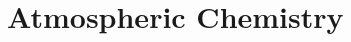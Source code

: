 %
%
\newcommand{\ddt}{\frac{\partial}{\partial t}}
\newcommand{\rhod}{\rho_{\rm dref}}
\newcommand{\scalar}[1]{{s}_\ast^{(#1)}}
\newcommand{\source}[1]{{\cal S}_\ast^{(#1)}}
\newcommand{\divergence}{{\vec\nabla\cdot}}
\newcommand{\NEQ}{N_{\rm eq}}
\newcommand{\NREAC}{N_{\rm reac}}
\newcommand{\avg}[1]{\overline{#1}}
\newcommand{\Pmuavg}{{P_\mu^{\rm avg}}}
\newcommand{\Pmusub}{{P_\mu^{\rm sub}}}
\newcommand{\fmuavg}{{f_\mu^{\rm avg}}}
\newcommand{\fmusub}{{f_\mu^{\rm sub}}}
%
\newcommand{\refs}[1]{{\small\par%
\noindent\global\hangindent=1cm\global\hangafter=1{#1}\par}}
%
\newcommand{\ul}[1]{$\underline{\mbox{#1}}$}
\newcommand{\oxy}{\mbox{O($^{1}$D)}}
\newcommand{\ogr}{\mbox{O($^{3}$P)}}
\newcommand{\oxyd}{\mbox{O$_2$}}
\newcommand{\ozo}{\mbox{O$_3$}}
\newcommand{\oxo}{\mbox{O$_4$}}
\newcommand{\sul}{\mbox{S$_2$}}
\newcommand{\hyd}{\mbox{H$_2$}}
\newcommand{\oio}{\mbox{O${_{4}}{^{2-}}$}}
\newcommand{\met}{\mbox{CH$_4$}}
\newcommand{\hem}{\mbox{N$_2$O}}
\newcommand{\dio}{\mbox{CO$_2$}}
\newcommand{\atm}{\mbox{atmosphere}}
\newcommand{\mol}{\mbox{molecules}}
\newcommand{\dep}{\mbox{deposition}}
\newcommand{\res}{\mbox{resistance}}
\newcommand{\vd}{\mbox{$v_d$}}
%
%
%
%
\chapter{Atmospheric Chemistry}
\minitoc
%
